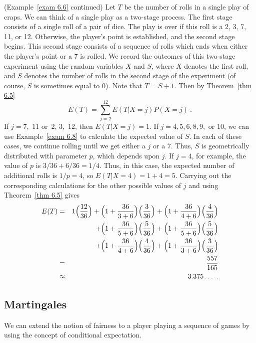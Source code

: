 \begin{example}(Example~\ref{exam 6.6} continued){\label{exam 6.10}} Let $T$ be
the number of rolls in a single play of craps.  We can think of a single play as a two-stage
process.  The first stage consists of a single roll of a pair of dice.  The play is over if this
roll is a 2, 3, 7, 11, or 12.  Otherwise, the player's point is established, and the second stage 
begins.  This second stage consists of a sequence of rolls which ends when either the player's point
or a 7 is rolled.  We record the outcomes of this two-stage experiment using the random variables
$X$ and $S$, where $X$ denotes the first roll, and $S$ denotes the number of rolls in the second 
stage of the experiment (of course, $S$ is sometimes equal to 0).  Note that $T = S+1$.
Then by Theorem~\ref{thm 6.5}
$$ E(T) = \sum_{j = 2}^{12} E(T|X = j) P(X = j)\ .
$$ If $j = 7$,~11 or~2, 3,~12, then $E(T|X = j) = 1$.   If $j = 4, 5, 6, 8, 9,$ or
$10$, we can use Example~\ref{exam 6.8} to calculate the expected value of $S$.  In each of 
these cases, we continue rolling until we get either a
$j$ or a 7.  Thus, $S$ is
geometrically distributed with parameter $p$, which depends upon $j$.  If
$j = 4$, for example, the value of $p$ is $3/36 + 6/36 = 1/4$.  Thus, in this case,
the expected number of additional rolls is $1/p = 4$, so 
$E(T|X = 4) = 1 + 4 = 5$.  Carrying out the corresponding calculations for the other
possible values of $j$ and using Theorem~\ref{thm 6.5} gives
\begin{eqnarray*} E(T) & = & 1\Bigl(\frac {12}{36}\Bigr)   
    + \Bigl(1 + \frac {36}{3 + 6}\Bigr)\Bigl(\frac 3{36}\Bigr)   
    + \Bigl(1 + \frac {36}{4 + 6}\Bigr)\Bigl(\frac 4{36}\Bigr) \\
& & + \Bigl(1 + \frac {36}{5 + 6}\Bigr)\Bigl(\frac 5{36}\Bigr)  
    + \Bigl(1 + \frac {36}{5 + 6}\Bigr)\Bigl(\frac 5{36}\Bigr) \\
& & + \Bigl(1 + \frac {36}{4 + 6}\Bigr)\Bigl(\frac 4{36}\Bigr) 
    + \Bigl(1 + \frac {36}{3 + 6}\Bigr)\Bigl(\frac 3{36}\Bigr) \\ 
& = & \frac {557}{165} \\
& \approx & 3.375\dots\ .
\end{eqnarray*}
\end{example}

\subsection*{Martingales}

We can extend the notion of fairness to a player playing a sequence of games by using
the concept of conditional expectation.

